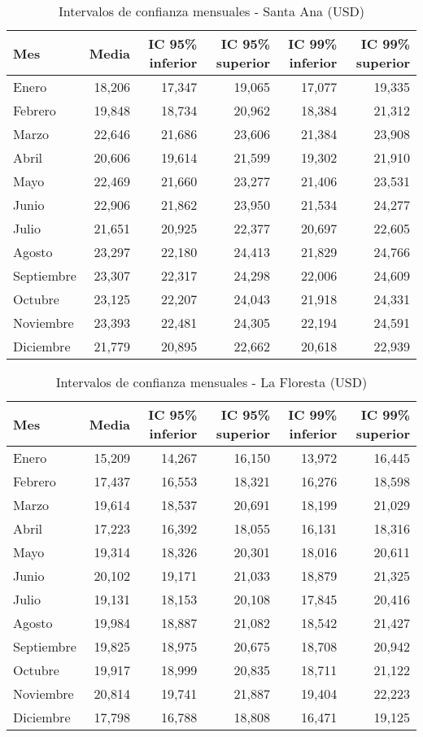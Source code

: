 \documentclass[12pt]{article}
\begin{document}
\begin{table}[H]
\centering
\caption{Intervalos de confianza mensuales - Santa Ana (USD)}
\begin{tabular}{lrrrrr}
\toprule
Mes & Media & IC 95\% inferior & IC 95\% superior & IC 99\% inferior & IC 99\% superior \\
\midrule
Enero & 18,206 & 17,347 & 19,065 & 17,077 & 19,335 \\
Febrero & 19,848 & 18,734 & 20,962 & 18,384 & 21,312 \\
Marzo & 22,646 & 21,686 & 23,606 & 21,384 & 23,908 \\
Abril & 20,606 & 19,614 & 21,599 & 19,302 & 21,910 \\
Mayo & 22,469 & 21,660 & 23,277 & 21,406 & 23,531 \\
Junio & 22,906 & 21,862 & 23,950 & 21,534 & 24,277 \\
Julio & 21,651 & 20,925 & 22,377 & 20,697 & 22,605 \\
Agosto & 23,297 & 22,180 & 24,413 & 21,829 & 24,766 \\
Septiembre & 23,307 & 22,317 & 24,298 & 22,006 & 24,609 \\
Octubre & 23,125 & 22,207 & 24,043 & 21,918 & 24,331 \\
Noviembre & 23,393 & 22,481 & 24,305 & 22,194 & 24,591 \\
Diciembre & 21,779 & 20,895 & 22,662 & 20,618 & 22,939 \\
\bottomrule
\end{tabular}
\end{table}

\begin{table}[H]
\centering
\caption{Intervalos de confianza mensuales - La Floresta (USD)}
\begin{tabular}{lrrrrr}
\toprule
Mes & Media & IC 95\% inferior & IC 95\% superior & IC 99\% inferior & IC 99\% superior \\
\midrule
Enero & 15,209 & 14,267 & 16,150 & 13,972 & 16,445 \\
Febrero & 17,437 & 16,553 & 18,321 & 16,276 & 18,598 \\
Marzo & 19,614 & 18,537 & 20,691 & 18,199 & 21,029 \\
Abril & 17,223 & 16,392 & 18,055 & 16,131 & 18,316 \\
Mayo & 19,314 & 18,326 & 20,301 & 18,016 & 20,611 \\
Junio & 20,102 & 19,171 & 21,033 & 18,879 & 21,325 \\
Julio & 19,131 & 18,153 & 20,108 & 17,845 & 20,416 \\
Agosto & 19,984 & 18,887 & 21,082 & 18,542 & 21,427 \\
Septiembre & 19,825 & 18,975 & 20,675 & 18,708 & 20,942 \\
Octubre & 19,917 & 18,999 & 20,835 & 18,711 & 21,122 \\
Noviembre & 20,814 & 19,741 & 21,887 & 19,404 & 22,223 \\
Diciembre & 17,798 & 16,788 & 18,808 & 16,471 & 19,125 \\
\bottomrule
\end{tabular}
\end{table}
\end{document}
